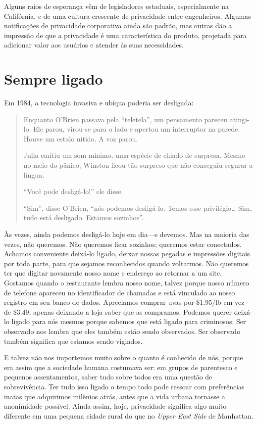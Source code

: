 \documentclass{book}
\newcommand{\ingles}[1]{\textit{#1}}
\begin{document}
Alguns raios de esperança vêm de legisladores estaduais, especialmente na
Califórnia, e de uma cultura crescente de privacidade entre engenheiros.
Algumas notificações de privacidade corporativa ainda são padrão, mas outras
dão a impressão de que a privacidade é uma característica do produto, projetada
para adicionar valor aos usuários e atender às suas necessidades.

\section{Sempre ligado}
\label{cap3:quem-sempre}
Em 1984, a tecnologia invasiva e ubíqua poderia ser desligada:

\begin{quote}
    Enquanto O'Brien passava pela ``teletela'', um pensamento pareceu atingi-lo.
    Ele parou, virou-se para o lado e apertou um interruptor na parede. Houve um
    estalo nítido. A voz parou.

    Julia emitiu um som mínimo, uma espécie de chiado de surpresa. Mesmo no meio do
    pânico, Winston ficou tão surpreso que não conseguiu segurar a língua.

    ``Você pode desligá-lo!'' ele disse.

    ``Sim'', disse O'Brien, ``nós podemos desligá-lo. Temos esse privilégio\ldots
    Sim, tudo está desligado. Estamos sozinhos''.
\end{quote}

Às vezes, ainda podemos desligá-lo hoje em dia---e devemos. Mas na maioria das
vezes, não queremos. Não queremos ficar sozinhos; queremos estar conectados.
Achamos conveniente deixá-lo ligado, deixar nossas pegadas e impressões
digitais por toda parte, para que sejamos reconhecidos quando voltarmos. Não
queremos ter que digitar novamente nosso nome e endereço ao retornar a um site.
Gostamos quando o restaurante lembra nosso nome, talvez porque nosso número de
telefone apareceu no identificador de chamadas e está vinculado ao nosso registro
em seu banco de dados. Apreciamos comprar uvas por \$1.95/lb em vez de \$3.49,
apenas deixando a loja saber que as compramos. Podemos querer deixá-lo ligado
para nós mesmos porque sabemos que está ligado para criminosos. Ser observado
nos lembra que eles também estão sendo observados. Ser observado também
significa que estamos sendo vigiados.

E talvez não nos importemos muito sobre o quanto é conhecido de nós, porque era
assim que a sociedade humana costumava ser: em grupos de parentesco e pequenos
assentamentos, saber tudo sobre todos era uma questão de sobrevivência. Ter
tudo isso ligado o tempo todo pode ressoar com preferências inatas que
adquirimos milênios atrás, antes que a vida urbana tornasse a anonimidade
possível. Ainda assim, hoje, privacidade significa algo muito diferente em uma
pequena cidade rural do que no \ingles{Upper East Side} de Manhattan.
\end{document}
